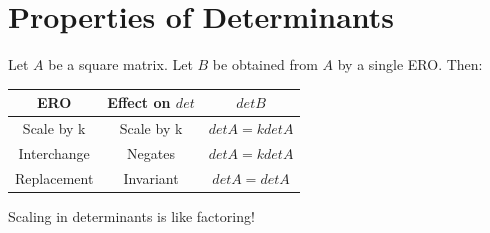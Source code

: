 \documentclass{report}
\begin{document}
\section{Properties of Determinants}

\begin{theorem}
Let $A$ be a square matrix. Let $B$ be obtained from $A$ by a single ERO. Then:
\begin{center}
	\begin{tabular}{ c|c|c } 
	 ERO & Effect on $det$ & $det B$ \\ 
	 \hline
	 Scale by k & Scale by k & $det A=kdetA$ \\ 
	 Interchange & Negates & $det A=kdetA$ \\ 
	 Replacement & Invariant & $det A=detA$ \\ 
	\end{tabular}
	\end{center}
\end{theorem}
\begin{remark}
	Scaling in determinants is like factoring!
\end{remark}
\end{document}
